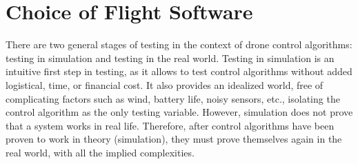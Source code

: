 \section{Choice of Flight Software}
\label{section:choice_of_flight_software}

There are two general stages of testing in the context of drone control algorithms:
testing in simulation and testing in the real world.
Testing in simulation is an intuitive first step in testing,
as it allows to test control algorithms without added logistical, time, or financial cost.
It also provides an idealized world, free of complicating factors such as wind, battery life, noisy sensors, etc.,
isolating the control algorithm as the only testing variable.
However, simulation does not prove that a system works in real life.
Therefore, after control algorithms have been proven to work in theory (simulation),
they must prove themselves again in the real world, with all the implied complexities.

